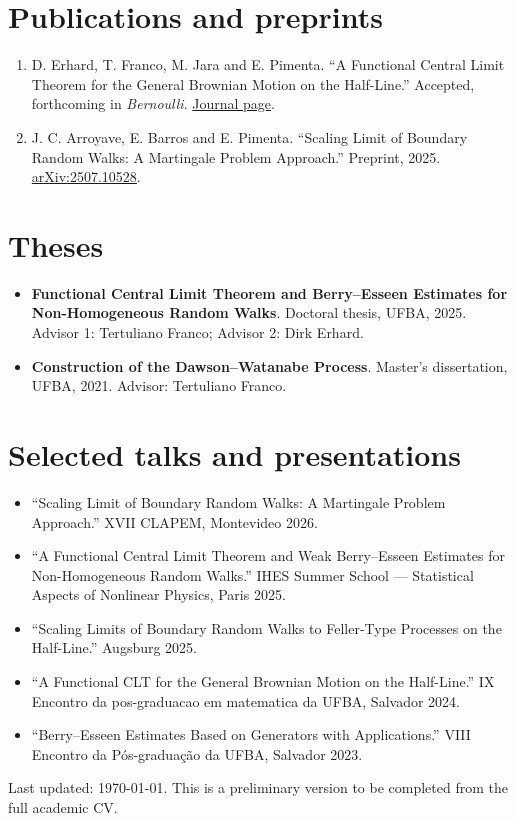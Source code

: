 \documentclass[10pt,a4paper]{article}
\begin{document}
\section*{Publications and preprints}
\begin{enumerate}
  \item D. Erhard, T. Franco, M. Jara and E. Pimenta. ``A Functional Central Limit Theorem for the General Brownian Motion on the Half-Line.'' Accepted, forthcoming in \emph{Bernoulli}. \href{https://www.bernoullisociety.org/index.php/publications/bernoulli-journal/bernoulli-journal-papers}{Journal page}.
  \item J. C. Arroyave, E. Barros and E. Pimenta. ``Scaling Limit of Boundary Random Walks: A Martingale Problem Approach.'' Preprint, 2025. \href{https://arxiv.org/abs/2507.10528}{arXiv:2507.10528}.
\end{enumerate}

\section*{Theses}
\begin{itemize}
  \item \textbf{Functional Central Limit Theorem and Berry--Esseen Estimates for Non-Homogeneous Random Walks}. Doctoral thesis, UFBA, 2025. Advisor 1: Tertuliano Franco; Advisor 2: Dirk Erhard.
  \item \textbf{Construction of the Dawson--Watanabe Process}. Master's dissertation, UFBA, 2021. Advisor: Tertuliano Franco.
\end{itemize}

\section*{Selected talks and presentations}
\begin{itemize}
  \item ``Scaling Limit of Boundary Random Walks: A Martingale Problem Approach.'' XVII CLAPEM, Montevideo 2026.
  \item ``A Functional Central Limit Theorem and Weak Berry--Esseen Estimates for Non-Homogeneous Random Walks.'' IHES Summer School --- Statistical Aspects of Nonlinear Physics, Paris 2025.
  \item ``Scaling Limits of Boundary Random Walks to Feller-Type Processes on the Half-Line.'' Augsburg 2025.
  \item ``A Functional CLT for the General Brownian Motion on the Half-Line.'' IX Encontro da pos-graduacao em matematica da UFBA, Salvador 2024.
  \item ``Berry--Esseen Estimates Based on Generators with Applications.'' VIII Encontro da Pós-graduação da UFBA, Salvador 2023.
\end{itemize}

\vfill
{\small\color{gray}Last updated: \today. This is a preliminary version to be completed from the full academic CV.}
\end{document}
